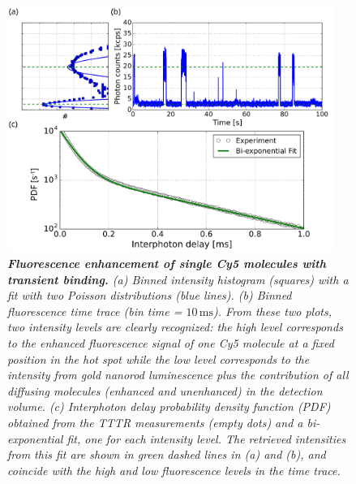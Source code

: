 \begin{figure}
\includegraphics[width=0.95\textwidth]{02_Figure_2_transient_single_site_results}%
\caption{\textit{\textbf{Fluorescence enhancement of single Cy5 molecules with transient binding.}
(a) Binned intensity histogram (squares) with a fit with two Poisson distributions (blue lines). 
(b) Binned fluorescence time trace (bin time = $10\,\mbox{ms}$). 
From these two plots, two intensity levels are clearly recognized: the high 
level corresponds to the enhanced fluorescence signal of one Cy5 molecule at 
a fixed position in the hot spot while the low level corresponds to the 
intensity from gold nanorod luminescence plus the contribution of all diffusing molecules (enhanced and unenhanced) in the detection volume.
(c) Interphoton delay probability density function (PDF) obtained 
from the TTTR measurements (empty dots) and a bi-exponential fit, one 
for each intensity level. The retrieved intensities from this fit are 
shown in green dashed lines in (a) and (b), and coincide with the 
high and low fluorescence levels in the time trace.
\label{fg:transient_results}}}
 \end{figure}



